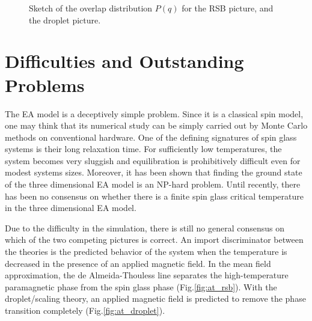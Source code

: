 \begin{figure}
  \centering 
  \hspace{0.5cm}
  \caption{Sketch of the overlap distribution $P(q)$ for the RSB picture, and the
droplet picture.}
  \label{fig:overlap}
\end{figure}


\section{Difficulties and Outstanding Problems}
The EA model is a deceptively simple problem. Since it is a classical spin 
model, one may think that its numerical study can be simply carried out by Monte
Carlo methods on conventional hardware. One of the defining signatures of spin glass 
systems is their long relaxation time. 
For sufficiently low temperatures, the system becomes very sluggish and 
equilibration is prohibitively difficult even for modest systems sizes. 
Moreover, it has been shown that finding the ground state of the three 
dimensional EA model is an NP-hard problem. \cite{Barahona-1982} 
Until recently, there has been no consensus on whether there is a finite spin 
glass critical temperature in the three dimensional EA model.


Due to the difficulty in the simulation, there is still no general consensus on
which of the two competing pictures is correct. 
An import discriminator between the theories is the predicted behavior of 
the system when the temperature is decreased in the presence of an applied magnetic
field. 
In the mean field approximation, the de Almeida-Thouless line separates the 
high-temperature paramagnetic phase from the spin glass phase (Fig.\ref{fig:at_rsb}). 
With the droplet/scaling theory, an applied magnetic field is predicted to remove
the phase transition completely (Fig.\ref{fig:at_droplet}).


